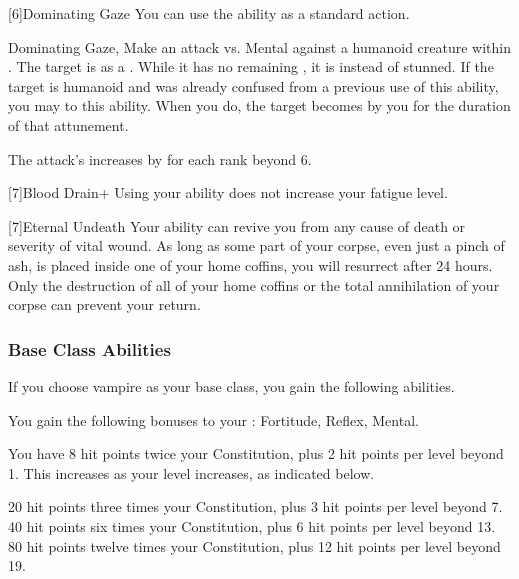             [6]{Dominating Gaze} You can use the  ability as a standard action.
            \begin{magicalactiveability}{Dominating Gaze}{, }
                \rankline
                Make an attack vs. Mental against a humanoid creature within \shortrange.
                \hit The target is \stunned as a .
                While it has no remaining , it is \confused instead of stunned.
                \crit If the target is humanoid and was already confused from a previous use of this ability, you may  to this ability.
                When you do, the target becomes \dominated by you for the duration of that attunement.

                \rankline
                The attack's  increases by  for each rank beyond 6.
            \end{magicalactiveability}

            [7]{Blood Drain+} Using your  ability does not increase your fatigue level.

            [7]{Eternal Undeath} Your  ability can revive you from any cause of death or severity of vital wound.
            As long as some part of your corpse, even just a pinch of ash, is placed inside one of your home coffins, you will resurrect after 24 hours.
            Only the destruction of all of your home coffins or the total annihilation of your corpse can prevent your return.

        \subsubsection{Base Class Abilities}
            If you choose vampire as your base class, you gain the following abilities.

            You gain the following bonuses to your :  Fortitude,  Reflex,  Mental.

                You have 8 hit points \add twice your Constitution, plus 2 hit points per level beyond 1.
                This increases as your level increases, as indicated below.
                \begin{itemize}
                     20 hit points \add three times your Constitution, plus 3 hit points per level beyond 7.
                     40 hit points \add six times your Constitution, plus 6 hit points per level beyond 13.
                     80 hit points \add twelve times your Constitution, plus 12 hit points per level beyond 19.
                \end{itemize}

